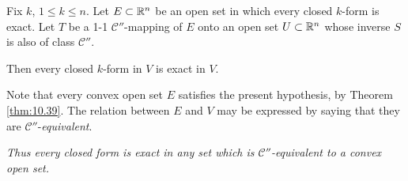 \begin{thm}
    \label{thm:10.40}
    Fix $k$, $1 \leq k \leq n$. 
    Let $E \subset {\protect\mathbb R}^n$ be an open set in which every closed $k$-form is exact. 
    Let $T$ be a 1-1 $\mathscr{C}''$-mapping of $E$ onto an open set $U \subset {\protect\mathbb R}^n$ 
    whose inverse $S$ is also of class $\mathscr{C}''$.
    
    Then every closed $k$-form in $V$ is exact in $V$.
\end{thm}

Note that every convex open set $E$ satisfies the present hypothesis, by
Theorem \ref{thm:10.39}. 
The relation between $E$ and $V$ may be expressed by saying
that they are $\mathscr{C}''$-\emph{equivalent}.

\emph{Thus every closed form is exact in any set which is $\mathscr{C}''$-equivalent to a convex open set.}

\begin{myremark}
    \label{myremark:10.40}
    
\end{myremark}